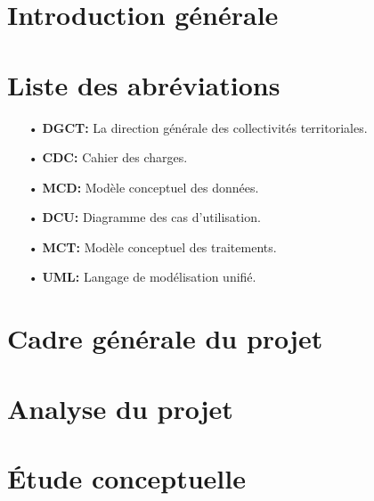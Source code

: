 \documentclass[a4paper]{report}
\begin{document}
\begin{doublespace}
	\chapter*{\centering Introduction générale}
	

	\chapter*{\centering Liste des abréviations}
	\begin{itemize}
		\item[•] \textbf{DGCT:} La direction générale des collectivités territoriales.
		\item[•] \textbf{CDC:} Cahier des charges.
		\item[•] \textbf{MCD:} Modèle conceptuel des données.
		\item[•] \textbf{DCU:} Diagramme des cas d'utilisation.
		\item[•] \textbf{MCT:} Modèle conceptuel des traitements.
		\item[•] \textbf{UML:} Langage de modélisation unifié.
	\end{itemize}

	\newpage

	 \setcounter{page}{1}
	\chapter{Cadre générale du projet}
	\fancyhead[L]{\hspace*{5cm}}
	

	\chapter{Analyse du projet}
	\fancyhead[L]{\hspace*{5cm}}
	

	\chapter{Étude conceptuelle}
	\fancyhead[L]{\hspace*{5cm}}
	


\end{doublespace}
\end{document}
